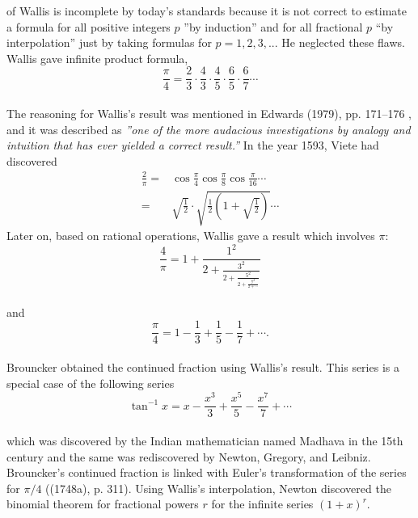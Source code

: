 \documentclass[a4paper,reqno,11pt]{book}
\theoremstyle{plain}%
\theoremstyle{definition}
\begin{document}
of Wallis is incomplete by today’s standards because it is not correct to estimate a formula for all positive integers $p$ ''by induction” and for all fractional $p$ ``by interpolation” just by taking formulas for $p=1,2,3,...$ He neglected these flaws. Wallis gave infinite product formula,
$$\frac{\pi}{4} = \frac{2}{3}\cdot\frac{4}{3}\cdot\frac{4}{5}\cdot\frac{6}{5}\cdot\frac{6}{7}\cdots$$
\\
The reasoning for Wallis's result was mentioned in Edwards (1979), pp. 171–176 \cite{ref 4}, and it was described as \textit{''one of the more audacious investigations by analogy and intuition that has ever yielded a correct result.”}
In the year 1593, Viete had discovered
\begin{eqnarray*}
\frac{2}{\pi} =& \cos\frac{\pi}{4}\cos\frac{\pi}{8}\cos\frac{\pi}{16}\cdots\\
=& \sqrt{\frac{1}{2}}\cdot\sqrt{\frac{1}{2}\left(1+\sqrt{\frac{1}{2}}\right)}\cdots
\end{eqnarray*}
Later on, based on rational operations, Wallis gave a result which involves $\pi$:\\
$$\frac{4}{\pi} = 1 + \frac{1^2}{2 + \frac{3^2}{2 + \frac{5^2}{2 + \frac{7^2}{2 + \cdots}}}}$$
\\
and 
$$\frac{\pi}{4} = 1 - \frac{1}{3} + \frac{1}{5} - \frac{1}{7} + \cdots.$$
\\
Brouncker obtained the continued fraction using Wallis’s result. This series is a special case of the following series
$$\tan^{-1}x = x - \frac{x^3}{3} + \frac{x^5}{5} - \frac{x^7}{7} + \cdots$$
\\
which was discovered by the Indian mathematician named Madhava in the 15th century and the same was rediscovered by Newton, Gregory, and Leibniz.
Brouncker’s continued fraction is linked with Euler's transformation of the series for $\pi/4$ ((1748a), p. 311). Using Wallis’s interpolation, Newton discovered the binomial theorem for fractional powers $r$ for the infinite series $(1+x)^r.$
\\
\end{document}
